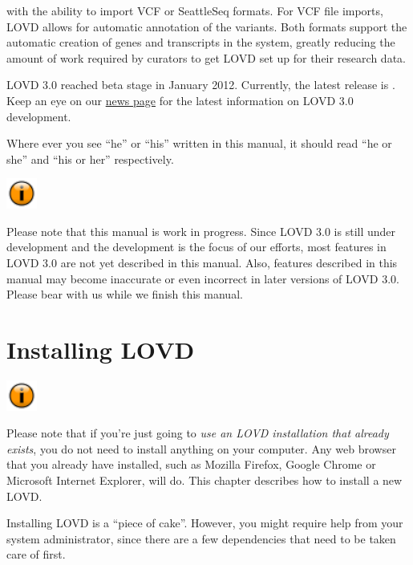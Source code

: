 \documentclass[a4paper,oneside,openany,12pt]{memoir}
\newcommand{\LOVDversion}{}                            %
\newlength{\infoboxlength}
\newlength{\infoboxinnerlength}
\newenvironment{infotable}
  {\begin{lrbox}{\infobox}%
    \begin{minipage}[t]{1.5cm}
      \centering
      \vspace{0pt}
      \includegraphics[width=1cm,height=1cm]{lovd_information.png}
    \end{minipage}
   \begin{minipage}[t]{\infoboxlength}\vspace{5pt}\begin{minipage}{\infoboxinnerlength}}
  {\vspace{6pt}\end{minipage}\end{minipage}\end{lrbox}%
   \begin{center}
   \fcolorbox{black}{LOVDlight}{\usebox{\infobox}}
   \end{center}}
\begin{document}
with the ability to import VCF or SeattleSeq formats.
For VCF file imports, LOVD allows for automatic annotation of the variants.
Both formats support the automatic creation of genes and transcripts in the system,
greatly reducing the amount of work required by curators to get LOVD set up for their research data.
\par
LOVD 3.0 reached beta stage in January 2012. Currently, the latest release is \LOVDversion.
Keep an eye on our \href{http://www.lovd.nl/3.0/news}{news page} for the latest information on LOVD 3.0 development.
\\
\par
Where ever you see ``he'' or ``his'' written in this manual, it should read ``he or she'' and ``his or her'' respectively.

\begin{infotable}
Please note that this manual is work in progress.
Since LOVD 3.0 is still under development and the development is the focus of our efforts, most features in LOVD 3.0 are not yet described in this manual.
Also, features described in this manual may become inaccurate or even incorrect in later versions of LOVD 3.0.
Please bear with us while we finish this manual.
\end{infotable}










\chapter{Installing LOVD}

\begin{infotable}
Please note that if you're just going to \emph{use an LOVD installation that already exists}, you do not need to install anything on your computer.
Any web browser that you already have installed, such as Mozilla Firefox, Google Chrome or Microsoft Internet Explorer, will do.
This chapter describes how to install a new LOVD.
\end{infotable}

Installing LOVD is a ``piece of cake''.
However, you might require help from your system administrator, since there are a few dependencies that need to be taken care of first.
\end{document}
